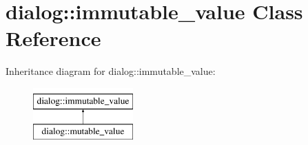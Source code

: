 \hypertarget{classdialog_1_1immutable__value}{}\section{dialog\+:\+:immutable\+\_\+value Class Reference}
\label{classdialog_1_1immutable__value}
Inheritance diagram for dialog\+:\+:immutable\+\_\+value\+:\begin{figure}[H]
\begin{center}
\leavevmode
\includegraphics[height=2.000000cm]{classdialog_1_1immutable__value}
\end{center}
\end{figure}
